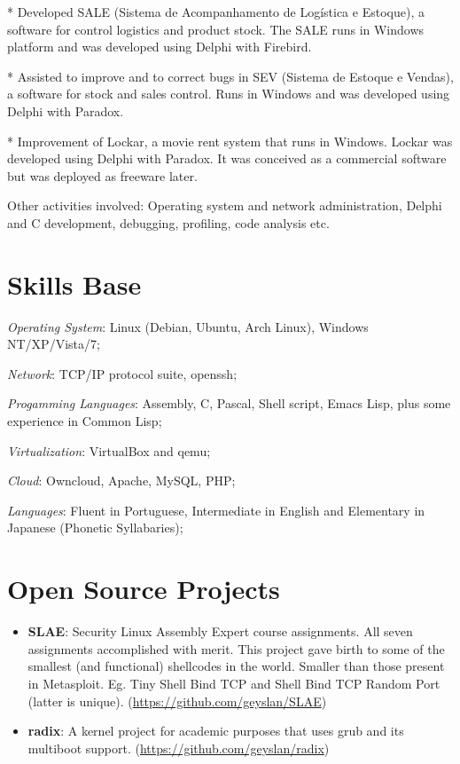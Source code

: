 \documentclass[margin]{res}
\begin{document}
\begin{resume}
* Developed SALE (Sistema de Acompanhamento de Logística e Estoque), a
software for control logistics and product stock. The SALE runs in
Windows platform and was developed using Delphi with Firebird.

* Assisted to improve and to correct bugs in SEV (Sistema de Estoque e
Vendas), a software for stock and sales control. Runs in Windows and
was developed using Delphi with Paradox.

* Improvement of Lockar, a movie rent system that runs in Windows. Lockar was
developed using Delphi with Paradox. It was conceived as a commercial software
but was deployed as freeware later.

Other activities involved: Operating system and network administration, Delphi
and C development, debugging, profiling, code analysis etc.

\section{Skills Base} \textit{Operating System}: Linux (Debian, Ubuntu, Arch
Linux), Windows NT/XP/Vista/7;

\textit{Network}: TCP/IP protocol suite, openssh;

\textit{Progamming Languages}: Assembly, C, Pascal, Shell script, Emacs Lisp,
plus some experience in Common Lisp;

\textit{Virtualization}: VirtualBox and qemu;

\textit{Cloud}: Owncloud, Apache, MySQL, PHP;

\textit{Languages}: Fluent in Portuguese, Intermediate in English and
Elementary in Japanese (Phonetic Syllabaries);

\section{Open Source Projects}
\begin{itemize}
\item \textbf{SLAE}: Security Linux Assembly Expert course assignments. All
  seven assignments accomplished with merit. This project gave birth to some of
  the smallest (and functional) shellcodes in the world. Smaller than those
  present in Metasploit. Eg. Tiny Shell Bind TCP and Shell Bind TCP Random Port
  (latter is unique).\newline
  (\url{https://github.com/geyslan/SLAE})\vspace{1mm}

\item \textbf{radix}: A kernel project for academic purposes that uses grub and
  its multiboot support.\newline
  (\url{https://github.com/geyslan/radix})\vspace{1mm}


\end{itemize}
\end{resume}
\end{document}
